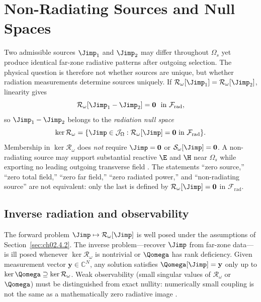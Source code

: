 
\section{Non-Radiating Sources and Null Spaces}
\label{sec:ch02.8}

Two admissible sources $\Jimp_1$ and $\Jimp_2$ may differ throughout $\Omega_s$ yet produce identical far-zone radiative patterns after outgoing selection. The physical question is therefore not whether sources are unique, but whether radiation measurements determine sources uniquely. If $\mathcal{R}_\omega[\Jimp_1]=\mathcal{R}_\omega[\Jimp_2]$, linearity gives
\begin{equation}
\label{eq:ch2.difference-null}
\mathcal{R}_\omega[\Jimp_1-\Jimp_2]=\mathbf{0}\ \ \text{in}\ \mathcal{F}_{\mathrm{rad}},
\end{equation}
so $\Jimp_1-\Jimp_2$ belongs to the \emph{radiation null space}
\begin{equation}
\label{eq:ch2.ker-R-omega}
\ker\mathcal{R}_\omega=\{\Jimp\in\mathcal{J}_\Omega:\mathcal{R}_\omega[\Jimp]=\mathbf{0}\ \text{in}\ \mathcal{F}_{\mathrm{rad}}\}.
\end{equation}
Membership in $\ker\mathcal{R}_\omega$ does \emph{not} require $\Jimp=\mathbf{0}$ or $\mathcal{S}_\omega[\Jimp]=\mathbf{0}$. A non-radiating source may support substantial reactive $\E$ and $\H$ near $\Omega_s$ while exporting no leading outgoing transverse field \cite{harrington2001,devaney2004}. The statements ``zero source,'' ``zero total field,'' ``zero far field,'' ``zero radiated power,'' and ``non-radiating source'' are not equivalent: only the last is defined by $\mathcal{R}_\omega[\Jimp]=\mathbf{0}$ in $\mathcal{F}_{\mathrm{rad}}$.

\subsection{Inverse radiation and observability}
\label{sec:ch02.8.1}

The forward problem $\Jimp\mapsto\mathcal{R}_\omega[\Jimp]$ is well posed under the assumptions of Section~\ref{sec:ch02.4.2}. The inverse problem---recover $\Jimp$ from far-zone data---is ill posed whenever $\ker\mathcal{R}_\omega$ is nontrivial or $\Qomega$ has rank deficiency. Given measurement vector $\mathbf{y}\in\mathbb{C}^{N}$, any solution satisfies $\Qomega[\Jimp]=\mathbf{y}$ only up to $\ker\Qomega\supseteq\ker\mathcal{R}_\omega$. Weak observability (small singular values of $\mathcal{R}_\omega$ or $\Qomega$) must be distinguished from exact nullity: numerically small coupling is not the same as a mathematically zero radiative image \cite{devaney2004,harrington2001}.

